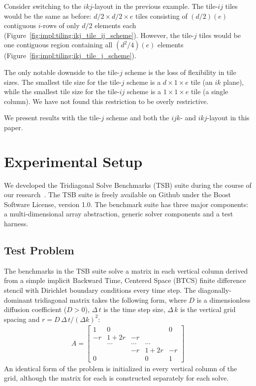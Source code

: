 \documentclass[10pt, conference, compsocconf]{IEEEtran}
\begin{document}
Consider switching to the \(ikj\)-layout in the previous example.
The tile-\(ij\) tiles would be the same as before: \(d/2 \times d/2 \times e\)
  tiles consisting of \((d/2)(e)\) contiguous \(i\)-rows of only \(d/2\)
  elements each (Figure~\ref{fig:impl:tiling:ikj_tile_ij_scheme}).
However, the tile-\(j\) tiles would be one contiguous region containing all
  \((d^2/4)(e)\) elements
  (Figure~\ref{fig:impl:tiling:ikj_tile_j_scheme}).

The only notable downside to the tile-\(j\) scheme is the loss of
  flexibility in tile sizes.
The smallest tile size for the tile-\(j\) scheme is a \(d \times 1 \times e\)
  tile (an \(ik\) plane), while the smallest tile size for the
  tile-\(ij\) scheme is a \(1 \times 1 \times e\) tile (a single column).
We have not found this restriction to be overly restrictive.

We present results with the tile-\(j\) scheme and both the \(ijk\)- and
  \(ikj\)-layout in this paper.

\section{Experimental Setup}
\label{sec:setup}
We developed the Tridiagonal Solve Benchmarks (TSB) suite during the course of
  our research~\cite{tsb_git}.
The TSB suite is freely available on Github under the Boost Software License,
  version 1.0.
The benchmark suite has three major components: a multi-dimensional array
  abstraction, generic solver components and a test harness.

\subsection{Test Problem}
\label{sec:setup:test_problem}

The benchmarks in the TSB suite solve a matrix in each vertical column derived
  from a simple implicit Backward Time, Centered Space (BTCS) finite difference
  stencil with Dirichlet boundary conditions every time step.
The diagonally-dominant tridiagonal matrix takes the following form,
  where \(D\) is a dimensionless diffusion coefficient (\(D > 0\)),
  \(\Delta \, t\) is the time step size, \(\Delta \, k\) is the vertical grid
  spacing and \(r=D \, \Delta \, t / (\Delta k)^2 \):
\begin{align*}
A = 
\begin{bmatrix}
1   & 0      &     &        & 0  \\
-r  & 1 + 2r & -r  &        &    \\
    & ...    & ... & ...    &    \\
    &        & -r  & 1 + 2r & -r \\
0   &        &     & 0      & 1
\end{bmatrix}  
\end{align*}
An identical form of the problem is initialized in every vertical column of the
  grid, although the matrix for each is constructed separately for each solve.
\end{document}
